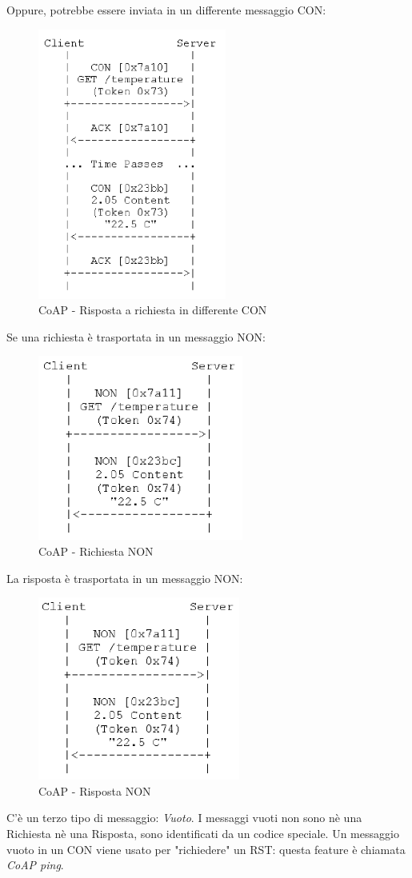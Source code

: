 \documentclass{article}
\begin{document}
Oppure, potrebbe essere inviata in un differente messaggio CON:
\begin{figure}[H]
\centering
\includegraphics[scale=0.6]{figures/coap risposta con.png}
\caption{CoAP - Risposta a richiesta in differente CON}
\end{figure}
Se una richiesta è trasportata in un messaggio NON:
\begin{figure}[H]
\centering
\includegraphics[scale=0.6]{figures/coap richiesta non.png}
\caption{CoAP - Richiesta NON}
\end{figure}
La risposta è trasportata in un messaggio NON:
\begin{figure}[H]
\centering
\includegraphics[scale=0.6]{figures/coap risposta non.png}
\caption{CoAP - Risposta NON}
\end{figure}
C'è un terzo tipo di messaggio: \textit{Vuoto}. I messaggi vuoti non sono nè una Richiesta nè una Risposta, sono identificati da un codice speciale. Un messaggio vuoto in un CON viene usato per "richiedere" un RST: questa feature è chiamata \textit{CoAP ping}. 
\end{document}
